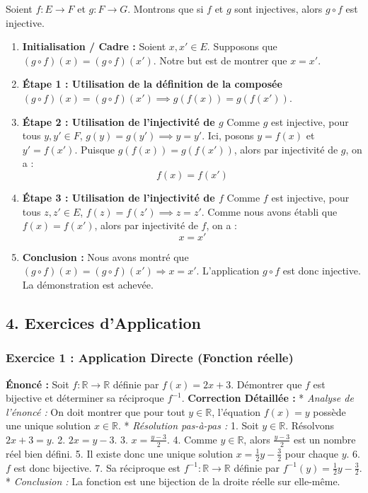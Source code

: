 \documentclass[12pt,a4paper]{report}
\begin{document}
Soient \(f : E \to F\) et \(g : F \to G\). Montrons que si \(f\) et
\(g\) sont injectives, alors \(g \circ f\) est injective.

\begin{enumerate}
\def\labelenumi{\arabic{enumi}.}
\item
  \textbf{Initialisation / Cadre :} Soient \(x, x' \in E\). Supposons
  que \((g \circ f)(x) = (g \circ f)(x')\). Notre but est de montrer que
  \(x = x'\).
\item
  \textbf{Étape 1 : Utilisation de la définition de la composée}
  \((g \circ f)(x) = (g \circ f)(x') \implies g(f(x)) = g(f(x'))\).
\item
  \textbf{Étape 2 : Utilisation de l'injectivité de \(g\)} Comme \(g\)
  est injective, pour tous \(y, y' \in F\),
  \(g(y) = g(y') \implies y = y'\). Ici, posons \(y = f(x)\) et
  \(y' = f(x')\). Puisque \(g(f(x)) = g(f(x'))\), alors par injectivité
  de \(g\), on a : \[f(x) = f(x')\]
\item
  \textbf{Étape 3 : Utilisation de l'injectivité de \(f\)} Comme \(f\)
  est injective, pour tous \(z, z' \in E\),
  \(f(z) = f(z') \implies z = z'\). Comme nous avons établi que
  \(f(x) = f(x')\), alors par injectivité de \(f\), on a : \[x = x'\]
\item
  \textbf{Conclusion :} Nous avons montré que
  \((g \circ f)(x) = (g \circ f)(x') \Rightarrow x = x'\). L'application
  \(g \circ f\) est donc injective. La démonstration est achevée.
\end{enumerate}

\subsection{4. Exercices d'Application}\label{exercices-dapplication}

\subsubsection{Exercice 1 : Application Directe (Fonction
réelle)}\label{exercice-1-application-directe-fonction-ruxe9elle}

\textbf{Énoncé :} Soit \(f : \mathbb{R} \to \mathbb{R}\) définie par
\(f(x) = 2x + 3\). Démontrer que \(f\) est bijective et déterminer sa
réciproque \(f^{-1}\). \textbf{Correction Détaillée :} * \emph{Analyse
de l'énoncé :} On doit montrer que pour tout \(y \in \mathbb{R}\),
l'équation \(f(x) = y\) possède une unique solution
\(x \in \mathbb{R}\). * \emph{Résolution pas-à-pas :} 1. Soit
\(y \in \mathbb{R}\). Résolvons \(2x + 3 = y\). 2. \(2x = y - 3\). 3.
\(x = \frac{y - 3}{2}\). 4. Comme \(y \in \mathbb{R}\), alors
\(\frac{y - 3}{2}\) est un nombre réel bien défini. 5. Il existe donc
une unique solution \(x = \frac{1}{2}y - \frac{3}{2}\) pour chaque
\(y\). 6. \(f\) est donc bijective. 7. Sa réciproque est
\(f^{-1} : \mathbb{R} \to \mathbb{R}\) définie par
\(f^{-1}(y) = \frac{1}{2}y - \frac{3}{2}\). * \emph{Conclusion :} La
fonction est une bijection de la droite réelle sur elle-même.
\end{document}
